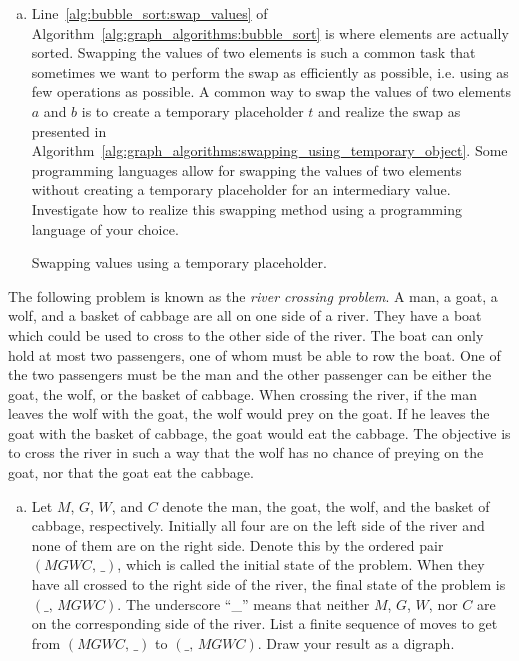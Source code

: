 \begin{problem}
\begin{enumerate}[(a)]
  \item Line~\ref{alg:bubble_sort:swap_values} of
    Algorithm~\ref{alg:graph_algorithms:bubble_sort} is where elements
    are actually sorted. Swapping the values of two elements is such a
    common task that sometimes we want to perform the swap as
    efficiently as possible, i.e. using as few operations as
    possible. A common way to swap the values of two elements $a$ and
    $b$ is to create a temporary placeholder $t$ and realize the swap
    as presented in
    Algorithm~\ref{alg:graph_algorithms:swapping_using_temporary_object}.
    Some programming languages allow for swapping the values of two
    elements without creating a temporary placeholder for an
    intermediary value. Investigate how to realize this swapping
    method using a programming language of your choice.
    \begin{algorithm}[!htbp]
      
      \caption{Swapping values using a temporary placeholder.}
      \label{alg:graph_algorithms:swapping_using_temporary_object}
    \end{algorithm}
  \end{enumerate}

\item The following problem is known as the
  \emph{river crossing problem}. A man,
  a goat, a wolf, and a basket of cabbage are all on one side of a
  river. They have a boat which could be used to cross to the other
  side of the river. The boat can only hold at most two passengers,
  one of whom must be able to row the boat. One of the two passengers
  must be the man and the other passenger can be either the goat, the
  wolf, or the basket of cabbage. When crossing the river, if the man
  leaves the wolf with the goat, the wolf would prey on the goat. If
  he leaves the goat with the basket of cabbage, the goat would eat
  the cabbage. The objective is to cross the river in such a way that
  the wolf has no chance of preying on the goat, nor that the goat eat
  the cabbage.
  \begin{enumerate}[(a)]
  \item Let $M$, $G$, $W$, and $C$ denote the man, the goat, the wolf,
    and the basket of cabbage, respectively. Initially all four are on
    the left side of the river and none of them are on the right
    side. Denote this by the ordered pair $(MGWC,\, \_)$, which is
    called the initial state of the problem. When
    they have all crossed to the right side of the river, the
    final state of the problem is $(\_,\, MGWC)$.
    The underscore ``\_'' means that neither $M$, $G$, $W$, nor $C$
    are on the corresponding side of the river. List a finite sequence
    of moves to get from $(MGWC,\, \_)$ to $(\_,\, MGWC)$. Draw your
    result as a digraph.


\end{enumerate}
\end{problem}
